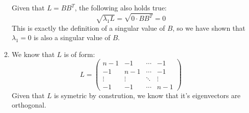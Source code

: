 \documentclass[11pt, legalpaper]{article}
\begin{document}
\begin{enumerate}
            Given that $L= BB^T$, the following also holds true:
            $$\sqrt{\lambda_1 L}=\sqrt{0 \cdot B B^T}=0$$
            This is exactly the definition of a singular value of $B$, so we have shown that $\lambda_1=0$ is also a singular value of $B$. 
    \item   We know that $L$ is of form:
            $$L=\begin{pmatrix}
                n-1 & -1 & \cdots & -1 \\
                -1 & n-1 & \cdots & -1 \\
                \vdots & \vdots & \ddots & \vdots \\
                -1 & -1 & \cdots & n-1
            \end{pmatrix}$$
            Given that $L$ is symetric by constrution, we know that it's eigenvectors are orthogonal. \\

\end{enumerate}
\end{document}
